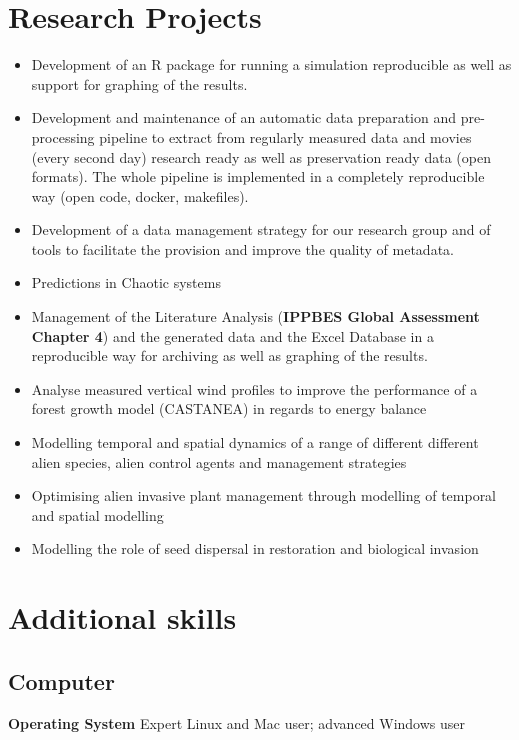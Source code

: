 \documentclass[a4paper]{article}
\begin{document}
\section{Research Projects}

\begin{itemize}
\item Development of an R package for running a simulation reproducible as
	well as support for graphing of the results. 
\item Development and maintenance of an automatic data preparation and
	pre-processing pipeline to extract from regularly measured data and
	movies (every second day) research ready  as well as preservation ready
	data (open formats). The whole pipeline is implemented in a completely
	reproducible way (open code, docker, makefiles).
\item Development of a data management strategy for our research group and of
	tools to facilitate the provision and improve the quality of metadata.
	\item Predictions in Chaotic systems
\item Management of the Literature Analysis (\textbf{IPPBES Global Assessment
	Chapter 4}) and the generated data and the Excel Database in a
	reproducible way for archiving as well as graphing of the results.
\item Analyse measured vertical wind profiles to improve the performance of a
	forest growth model (CASTANEA) in regards to energy balance 
\item Modelling temporal and spatial dynamics of a range of different
	different alien species, alien control agents and management strategies
\item Optimising alien invasive plant management through modelling of
	temporal and spatial modelling
\item Modelling the role of seed dispersal in restoration and biological
	invasion
\end{itemize}


\section{Additional skills}

\subsection{Computer}

\textbf{Operating System} Expert Linux and Mac user; advanced Windows user
\end{document}
